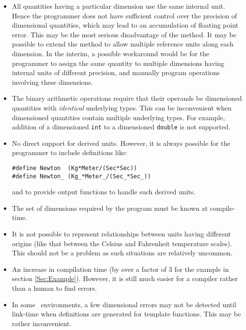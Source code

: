 \begin{itemize}

\item All quantities having a particular dimension use the same
internal unit. Hence the programmer does not have sufficient
control over the precision of dimensional quantities, which may
lead to an accumulation of floating point error.  This may be the
most serious disadvantage of the method.  It may be possible to
extend the method to allow multiple reference units along each
dimension.  In the interim, a possible workaround would be for the
programmer to assign the same quantity to multiple dimensions
having internal units of different precision, and manually program
operations involving these dimensions.

\item The binary arithmetic operations require that their operands
be dimensioned quantities with {\em identical} underlying types.
This can be inconvenient when dimensioned quantities contain
multiple underlying types. For example, addition of a dimensioned
{\tt int} to a dimensioned {\tt double} is not supported.

\item No direct support for derived units.  However, it is always
possible for the programmer to include definitions like:
{\small
\begin{verbatim}
#define Newton	(Kg*Meter/(Sec*Sec))
#define Newton_	(Kg_*Meter_/(Sec_*Sec_))
\end{verbatim}
}
and to provide output functions to handle such derived units.

\item The set of dimensions required by the program must be known
at compile-time.

\item It is not possible to represent relationships between units
having different origins (like that between the Celsius and
Fahrenheit temperature scales).  This should not be a problem as
such situations are relatively uncommon.

\item An increase in compilation time (by over a factor of 3 for
the example in section \ref{Sec:Example}).   However, it is still much
easier for a compiler rather than a human to find errors.

\item In some \cpp\ environments, a few dimensional errors may not
be detected until link-time when definitions are generated for
template functions.  This may be rather inconvenient.


\end{itemize}
